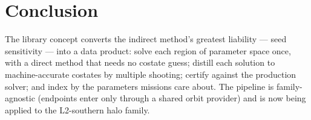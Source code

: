 \documentclass[11pt]{article}
\begin{document}
\section{Conclusion}

The library concept converts the indirect method's greatest liability ---
seed sensitivity --- into a data product: solve each region of parameter
space once, with a direct method that needs no costate guess; distill each
solution to machine-accurate costates by multiple shooting; certify against
the production solver; and index by the parameters missions care about.
The pipeline is family-agnostic (endpoints enter only through a shared
orbit provider) and is now being applied to the L2-southern halo family.
\end{document}
